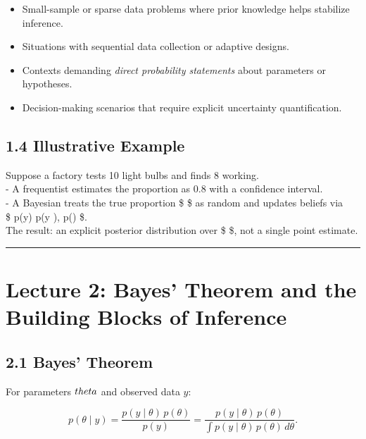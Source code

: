 \documentclass[
  letterpaper,
  DIV=11,
  numbers=noendperiod]{scrreprt}
\providecommand{\tightlist}{%
  \setlength{\itemsep}{0pt}\setlength{\parskip}{0pt}}
\begin{document}
\begin{itemize}
\tightlist
\item
  Small-sample or sparse data problems where prior knowledge helps
  stabilize inference.\\
\item
  Situations with sequential data collection or adaptive designs.\\
\item
  Contexts demanding \emph{direct probability statements} about
  parameters or hypotheses.\\
\item
  Decision-making scenarios that require explicit uncertainty
  quantification.
\end{itemize}

\subsection{1.4 Illustrative Example}\label{illustrative-example}

Suppose a factory tests 10 light bulbs and finds 8 working.\\
- A frequentist estimates the proportion as 0.8 with a confidence
interval.\\
- A Bayesian treats the true proportion \$ \theta \$ as random and
updates beliefs via\\
\$ p(\theta \mid y) \propto p(y \mid \theta), p(\theta) \$.\\
The result: an explicit posterior distribution over \$ \theta \$, not a
single point estimate.

\begin{center}\rule{0.5\linewidth}{0.5pt}\end{center}

\section{Lecture 2: Bayes' Theorem and the Building Blocks of
Inference}\label{lecture-2-bayes-theorem-and-the-building-blocks-of-inference}

\subsection{2.1 Bayes' Theorem}\label{bayes-theorem}

For parameters \(\\theta\) and observed data \(y\):

\[
p(\theta \mid y) = \frac{p(y \mid \theta)\, p(\theta)}{p(y)} = 
\frac{p(y \mid \theta)\, p(\theta)}{\int p(y \mid \theta)\, p(\theta)\, d\theta}.
\]
\end{document}
